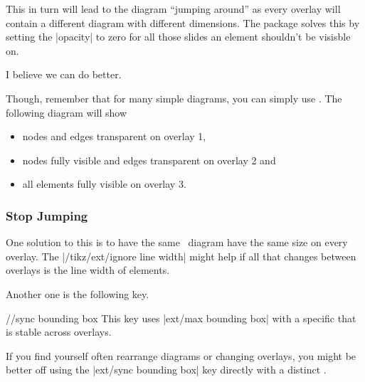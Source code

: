 This in turn will lead to the diagram \enquote{jumping around}
as every overlay will contain a different diagram with different dimensions.
The  package solves this by setting the |opacity| to zero
for all those slides an element shouldn't be visisble on.

I believe we can do better.

Though, remember that for many simple diagrams,
you can simply use .
The following diagram will show
\begin{itemize}
\item nodes and edges transparent on overlay 1,
\item nodes fully visible and edges transparent on overlay 2 and
\item all elements fully visible on overlay 3.
\end{itemize}
\begin{codeexample}[preamble=\usetikzlibrary{ext.beamer} \setbeamercovered{transparent},code only]
\end{codeexample}
\subsubsection{Stop Jumping}
One solution to this is to have the same \tikzname\ diagram
have the same size on every overlay.
The |/tikz/ext/ignore line width| might help if all that changes between overlays
is the line width of elements.

Another one is the following key.
\begin{key}{/\tikzext/sync bounding box}
This key uses |ext/max bounding box| with a specific 
that is stable across overlays.

If you find yourself often rearrange diagrams or changing overlays,
you might be better off using the |ext/sync bounding box| key
directly with a distinct .
\end{key}

